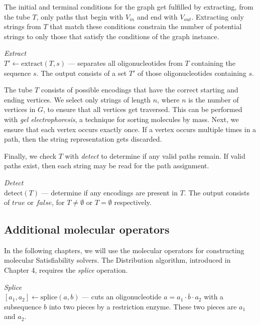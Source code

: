 The initial and terminal conditions for the graph get fulfilled by extracting, from the tube $T$, only paths that begin with $V_{in}$ and end with $V_{out}$.  Extracting only strings from $T$ that match these conditions constrain the number of potential strings to only those that satisfy the conditions of the graph instance.

\begin{definition}
\textit{Extract}\\
$ T' \leftarrow \text{extract}( T, s)$ --- separates all oligonucleotides from $T$ containing the sequence $s$.  The output consists of a set $T'$ of those oligonucleotides containing $s$.
\end{definition}

The tube $T$ consists of possible encodings that have the correct starting and ending vertices. We select only strings of length $n$, where $n$ is the number of vertices in $G$, to ensure that all vertices get traversed.  This can be performed with \textit{gel electrophoresis}, a technique for sorting molecules by mass.  Next, we ensure that each vertex occurs exactly once.  If a vertex occurs multiple times in a path, then the string representation gets discarded.

Finally, we check $T$ with \textit{detect} to determine if any valid paths remain.  If valid paths exist, then each string may be read for the path assignment.

\begin{definition}
\textit{Detect}\\
$ \text{detect}( T)$ --- determine if any encodings are present in $T$.  The output consists of $true$ or $false$, for $T \neq \emptyset$ or $T = \emptyset$ respectively.
\end{definition}

\subsection{Additional molecular operators}

In the following chapters, we will use the molecular operators for constructing molecular {\sc Satisfiability} solvers.  The Distribution algorithm, introduced in Chapter 4, requires the \textit{splice} operation.
\begin{definition}
\textit{Splice}\\
$[a_1, a_2] \leftarrow \text{splice}(a, b)$ --- cuts an oligonucleotide $a = a_1 \cdot \overline{b} \cdot a_2$ with a subsequence $b$ into two pieces by a restriction enzyme.  These two pieces are $a_1$ and $a_2$.
\end{definition}

